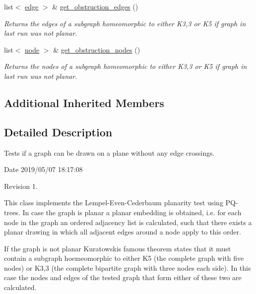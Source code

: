 \begin{DoxyCompactItemize}
list$<$ \mbox{\hyperlink{classedge}{edge}} $>$ \& \mbox{\hyperlink{classplanarity_ac9021696934cc24afbc36aa307b2919b}{get\+\_\+obstruction\+\_\+edges}} ()
\begin{DoxyCompactList}\small\item\em Returns the edges of a subgraph homeomorphic to either K3,3 or K5 if graph in last run was not planar. \end{DoxyCompactList}\item 
list$<$ \mbox{\hyperlink{classnode}{node}} $>$ \& \mbox{\hyperlink{classplanarity_ac1bee50e38d398f3868a3308164caa31}{get\+\_\+obstruction\+\_\+nodes}} ()
\begin{DoxyCompactList}\small\item\em Returns the nodes of a subgraph homeomorphic to either K3,3 or K5 if graph in last run was not planar. \end{DoxyCompactList}\end{DoxyCompactItemize}
\subsection*{Additional Inherited Members}


\subsection{Detailed Description}
Tests if a graph can be drawn on a plane without any edge crossings. 

\begin{DoxyParagraph}{Date}
2019/05/07 18\+:17\+:08 
\end{DoxyParagraph}
\begin{DoxyParagraph}{Revision}
1. 
\end{DoxyParagraph}


This class implements the Lempel-\/\+Even-\/\+Cederbaum planarity test using P\+Q-\/trees. In case the graph is planar a planar embedding is obtained, i.\+e. for each node in the graph an ordered adjacency list is calculated, such that there exists a planar drawing in which all adjacent edges around a node apply to this order.

If the graph is not planar Kuratowski\textquotesingle{}s famous theorem states that it must contain a subgraph hoemeomorphic to either K5 (the complete graph with five nodes) or K3,3 (the complete bipartite graph with three nodes each side). In this case the nodes and edges of the tested graph that form either of these two are calculated.

